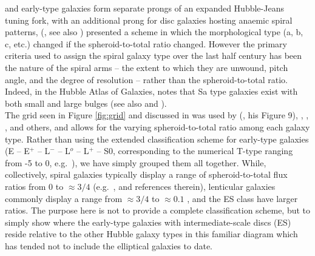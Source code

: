 \documentclass[useAMS,usenatbib,article]{mnras}
\begin{document}
{and early-type galaxies form separate prongs of an expanded Hubble-Jeans tuning fork, 
with an additional prong for disc galaxies hosting anaemic spiral patterns, 
\citeauthor{cappellari2011kmdr} (\citeyear{cappellari2011kmdr}, see also \citealt{kormendybender2012}) 
presented a scheme in which the morphological type (a, b, c, etc.) 
changed if the spheroid-to-total ratio changed.  
However the primary criteria used to assign the spiral galaxy type over the last half century \citep{sandage1961} 
has been the nature of the spiral arms -- the extent to which they are unwound, pitch angle, 
and the degree of resolution -- rather than the spheroid-to-total ratio.   
Indeed, in the Hubble Atlas of Galaxies, \cite{sandage1961} notes that Sa type galaxies exist with both small and large bulges 
(see also \citealt{VorontsovvelYaminovArkhipova1962} and \citealt{Vorontsovvelyaminovnoskova1973}). \\
The grid seen in Figure \ref{fig:grid} and discussed in \cite{graham2014review} 
was used by \citeauthor{freeman1970} (\citeyear{freeman1970}, his Figure 9), 
\cite{boroson1981}, \cite{kent1985}, \cite{kodaira1986}, \cite{simiendevaucouleurs1986} and others, 
and allows for the varying spheroid-to-total ratio among each galaxy type.   
Rather than using the extended classification scheme for early-type galaxies (E -- E$^+$ -- L$^-$ -- L$^o$ -- L$^+$ -- S0, 
corresponding to the numerical T-type ranging from -5 to 0, e.g.~\citealt{devaucouleurs1964,heidmann1972}), 
we have simply grouped them all together.  
While, collectively, spiral galaxies typically display a range of spheroid-to-total flux 
ratios from $0$ to $\approx 3/4$ (e.g.~\citealt{grahamworley2008}, and references therein), 
lenticular galaxies commonly display a range from $\approx 3/4$ to $\approx 0.1$ \citep{laurikainen2010}, and the ES class have larger ratios.  
The purpose here is not to provide a complete classification scheme, 
but to simply show where the early-type galaxies with intermediate-scale discs (ES) reside relative to the other 
Hubble galaxy types in this familiar diagram which has tended not to include the elliptical galaxies to date. }
\end{document}
